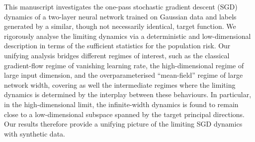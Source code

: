 This manuscript investigates the one-pass stochastic gradient descent (SGD) dynamics of a two-layer neural network trained on Gaussian data and labels generated by a similar, though not necessarily identical, target function. We rigorously analyse the limiting dynamics via a deterministic and low-dimensional description in terms of the sufficient statistics for the population risk. Our unifying analysis bridges different regimes of interest, such as the classical gradient-flow regime of vanishing learning rate, the high-dimensional regime of large input dimension, and the overparameterised ``mean-field'' regime of large network width, covering as well the intermediate regimes where the limiting dynamics is determined by the interplay between these behaviours. In particular, in the high-dimensional limit, the infinite-width dynamics is found to remain close to a low-dimensional subspace spanned by the target principal directions. Our results therefore provide a unifying picture of the limiting SGD dynamics with synthetic data.
